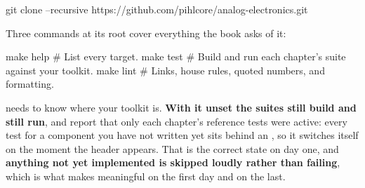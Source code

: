 \begin{shell}
git clone --recursive https://github.com/pihlcore/analog-electronics.git
\end{shell}

\noindent Three commands at its root cover everything the book asks of it:

\begin{shell}
make help                 # List every target.
make test                 # Build and run each chapter's suite against your toolkit.
make lint                 # Links, house rules, quoted numbers, and formatting.
\end{shell}

\noindent {} needs  to know where your toolkit is. \textbf{With it
unset the suites still build and still run}, and report that only each chapter's reference tests
were active: every test for a component you have not written yet sits behind an
, so it switches itself on the moment the header appears. That is the
correct state on day one, and \textbf{anything not yet implemented is skipped loudly rather than
failing}, which is what makes  meaningful on the first day and on the last.
